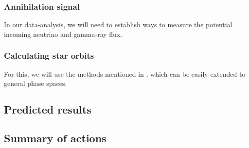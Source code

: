 \documentclass[12pt]{article}
\begin{document}

\subsubsection{Annihilation signal}

In our data-analysis, we will need to establish ways to measure the potential incoming neutrino and gamma-ray flux.

\subsubsection{Calculating star orbits}

For this, we will use the methods mentioned in \citep{Sadeghian_Ferrer_Will_2013}, which can be easily extended to 
general phase spaces.

\subsection{Predicted results}


\subsection{Summary of actions}
\end{document}
